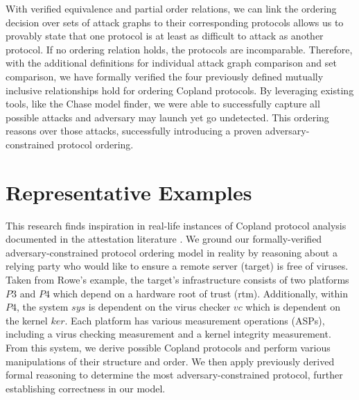 \documentclass[runningheads]{llncs}
\theoremstyle{definition}
\begin{document}
With verified equivalence and partial order relations, we can link the ordering decision over sets of attack graphs to their corresponding protocols allows us to provably state that one protocol is at least as difficult to attack as another protocol. If no ordering relation holds, the protocols are incomparable. Therefore, with the additional definitions for individual attack graph comparison and set comparison, we have formally verified the four previously defined mutually inclusive relationships hold for ordering Copland protocols. By leveraging existing tools, like the Chase model finder, we were able to successfully capture all possible attacks and adversary may launch yet go undetected. This ordering reasons over those attacks, successfully introducing a proven adversary-constrained protocol ordering. 


\section{Representative Examples}

This research finds inspiration in real-life instances of Copland protocol analysis documented in the attestation literature \cite{Rowe:2021:OnOrdering,Coker::Principles-of-R}. We ground our formally-verified adversary-constrained protocol ordering model in reality by reasoning about a relying party who would like to ensure a remote server (target) is free of viruses. Taken from Rowe's \cite{Rowe:2016:Confining} example, the target's infrastructure consists of two platforms $P3$ and $P4$ which depend on a hardware root of trust (rtm). Additionally, within $P4$, the system $sys$ is dependent on the virus checker $vc$ which is dependent on the kernel $ker$.  Each platform has various measurement operations (ASPs), including a virus checking measurement and a kernel integrity measurement. From this system, we derive possible Copland protocols and perform various manipulations of their structure and order. We then apply previously derived formal reasoning to determine the most adversary-constrained protocol, further establishing correctness in our model.

\end{document}
